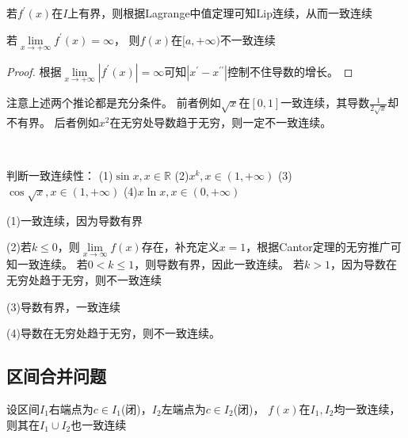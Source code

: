 \begin{corollary}[导数有界一定一致连续]
  若$f^{\prime}(x)$在$I$上有界，则根据Lagrange中值定理可知Lip连续，从而一致连续
\end{corollary}

\begin{corollary}[导数在无穷处趋于无穷则不一致连续]
  若$\lim \limits _{x \rightarrow +\infty}f^{\prime}(x) = \infty$，
  则$f(x)$在$[a,+\infty)$不一致连续
\end{corollary}

\begin{proof}
  根据$\lim \limits _{x \rightarrow +\infty}|f^{\prime}(x)| = \infty$可知$|x^{\prime} - x^{\prime\prime}|$控制不住导数的增长。
\end{proof}

\begin{note}
  注意上述两个推论都是充分条件。
  前者例如$\sqrt{x}$在$[0,1]$一致连续，其导数$\frac{1}{2 \sqrt{x}}$却不有界。
  后者例如$x^2$在无穷处导数趋于无穷，则一定不一致连续。
\end{note}

~

\begin{exercise}[基础练习]
  判断一致连续性：
  (1)$\sin x, x \in \mathbb{R}$
  (2)$x^k, x \in (1,+\infty)$
  (3)$\cos \sqrt{x}, x \in (1, +\infty)$
  (4)$x\ln x, x \in (0,+\infty)$
\end{exercise}

\begin{solution}
  (1)一致连续，因为导数有界

  (2)若$k \leq 0$，则$\lim \limits _{x \rightarrow \infty}f(x)$存在，补充定义$x = 1$，根据Cantor定理的无穷推广可知一致连续。
  若$0 < k \leq 1$，则导数有界，因此一致连续。
  若$k > 1$，因为导数在无穷处趋于无穷，则不一致连续

  (3)导数有界，一致连续

  (4)导数在无穷处趋于无穷，则不一致连续。
\end{solution}

\subsection{区间合并问题}

\begin{theorem}[一致连续区间合并定理]
  设区间$I_1$右端点为$c \in I_1$(闭)，$I_2$左端点为$c \in I_2$(闭)，
  $f(x)$在$I_1,I_2$均一致连续，则其在$I_1 \cup I_2$也一致连续
\end{theorem}

